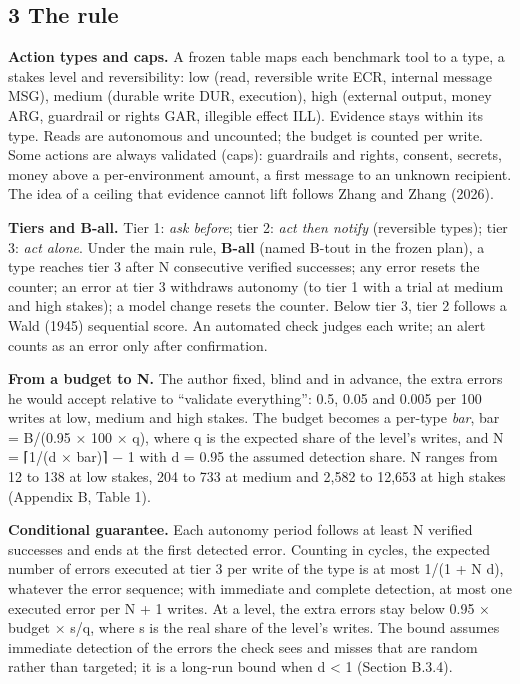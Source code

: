 \subsection{3 The rule}\label{the-rule}

\textbf{Action types and caps.} A frozen table maps each benchmark tool to a type, a stakes level and reversibility: low (read, reversible write ECR, internal message MSG), medium (durable write DUR, execution), high (external output, money ARG, guardrail or rights GAR, illegible effect ILL). Evidence stays within its type. Reads are autonomous and uncounted; the budget is counted per write. Some actions are always validated (caps): guardrails and rights, consent, secrets, money above a per-environment amount, a first message to an unknown recipient. The idea of a ceiling that evidence cannot lift follows Zhang and Zhang (2026).

\textbf{Tiers and B-all.} Tier 1: \emph{ask before}; tier 2: \emph{act then notify} (reversible types); tier 3: \emph{act alone}. Under the main rule, \textbf{B-all} (named B-tout in the frozen plan), a type reaches tier 3 after N consecutive verified successes; any error resets the counter; an error at tier 3 withdraws autonomy (to tier 1 with a trial at medium and high stakes); a model change resets the counter. Below tier 3, tier 2 follows a Wald (1945) sequential score. An automated check judges each write; an alert counts as an error only after confirmation.

\textbf{From a budget to N.} The author fixed, blind and in advance, the extra errors he would accept relative to ``validate everything'': 0.5, 0.05 and 0.005 per 100 writes at low, medium and high stakes. The budget becomes a per-type \emph{bar}, bar = B/(0.95 × 100 × q), where q is the expected share of the level's writes, and N = ⌈1/(d × bar)⌉ − 1 with d = 0.95 the assumed detection share. N ranges from 12 to 138 at low stakes, 204 to 733 at medium and 2,582 to 12,653 at high stakes (Appendix B, Table 1).

\textbf{Conditional guarantee.} Each autonomy period follows at least N verified successes and ends at the first detected error. Counting in cycles, the expected number of errors executed at tier 3 per write of the type is at most 1/(1 + N d), whatever the error sequence; with immediate and complete detection, at most one executed error per N + 1 writes. At a level, the extra errors stay below 0.95 × budget × s/q, where s is the real share of the level's writes. The bound assumes immediate detection of the errors the check sees and misses that are random rather than targeted; it is a long-run bound when d \textless{} 1 (Section B.3.4).

